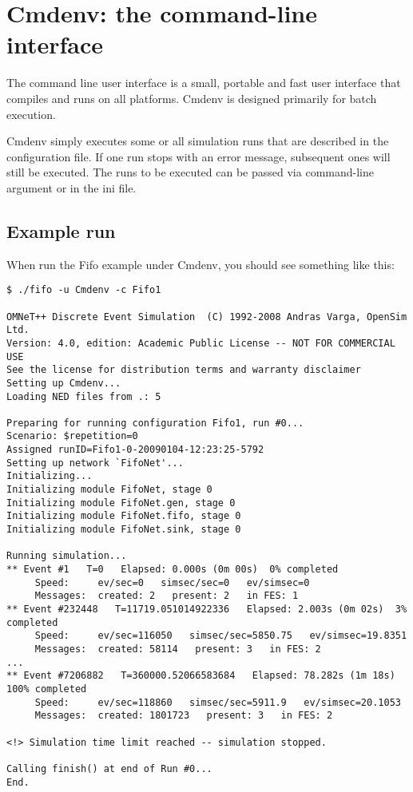 \section{Cmdenv: the command-line interface}

The command line user interface is
a small, portable and fast user interface that compiles and runs on
all platforms. Cmdenv is designed primarily for batch execution.

Cmdenv simply executes some or all simulation runs that are described
in the configuration file. If one run stops with an error message,
subsequent ones will still be executed. The runs to be executed can be
passed via command-line argument or in the ini file.

\subsection{Example run}

When run the Fifo example under Cmdenv, you should see
something like this:

\begin{verbatim}
$ ./fifo -u Cmdenv -c Fifo1

OMNeT++ Discrete Event Simulation  (C) 1992-2008 Andras Varga, OpenSim Ltd.
Version: 4.0, edition: Academic Public License -- NOT FOR COMMERCIAL USE
See the license for distribution terms and warranty disclaimer
Setting up Cmdenv...
Loading NED files from .: 5

Preparing for running configuration Fifo1, run #0...
Scenario: $repetition=0
Assigned runID=Fifo1-0-20090104-12:23:25-5792
Setting up network `FifoNet'...
Initializing...
Initializing module FifoNet, stage 0
Initializing module FifoNet.gen, stage 0
Initializing module FifoNet.fifo, stage 0
Initializing module FifoNet.sink, stage 0

Running simulation...
** Event #1   T=0   Elapsed: 0.000s (0m 00s)  0% completed
     Speed:     ev/sec=0   simsec/sec=0   ev/simsec=0
     Messages:  created: 2   present: 2   in FES: 1
** Event #232448   T=11719.051014922336   Elapsed: 2.003s (0m 02s)  3% completed
     Speed:     ev/sec=116050   simsec/sec=5850.75   ev/simsec=19.8351
     Messages:  created: 58114   present: 3   in FES: 2
...
** Event #7206882   T=360000.52066583684   Elapsed: 78.282s (1m 18s)  100% completed
     Speed:     ev/sec=118860   simsec/sec=5911.9   ev/simsec=20.1053
     Messages:  created: 1801723   present: 3   in FES: 2

<!> Simulation time limit reached -- simulation stopped.

Calling finish() at end of Run #0...
End.
\end{verbatim}


